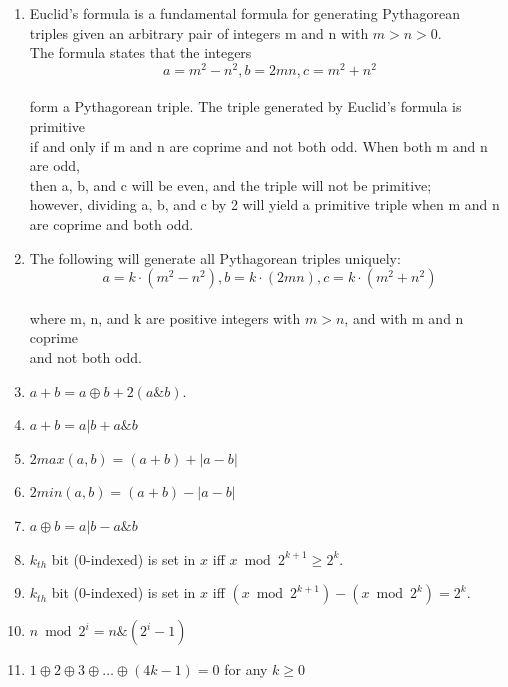 \begin{enumerate}
  \item Euclid's formula is a fundamental formula for generating Pythagorean\\
  triples given an arbitrary pair of integers m and n with $m > n > 0$. \\
  The formula states that the integers\\
  $$a = m^2 - n^2, b = 2mn, c = m^2 + n^2$$\\
  form a Pythagorean triple. The triple generated by Euclid's formula is primitive \\
  if and only if m and n are coprime and not both odd. When both m and n are odd, \\
  then a, b, and c will be even, and the triple will not be primitive; \\
  however, dividing a, b, and c by 2 will yield a primitive triple when m and n \\
  are coprime and both odd.

  \item The following will generate all Pythagorean triples uniquely:  \\
  $$a = k \cdot (m^2 - n^2) , b = k \cdot (2mn) , c = k \cdot (m^2 + n^2)$$\\
  where m, n, and k are positive integers with $m > n$, and with m and n coprime \\
  and not both odd.  

  \item $a + b = a \oplus b + 2(a \& b)$.
  \item $a + b = a | b + a \& b$
  \item $2 max(a, b) = (a+b) + |a-b|$
  \item $2 min(a, b) = (a+b) - |a-b|$
  \item $a \oplus b = a | b - a \& b$
  \item $k_{th}$ bit (0-indexed) is set in $x$ iff $x \bmod 2^{k+1} \ge 2^k$.
  \item $k_{th}$ bit (0-indexed) is set in $x$ iff $(x \bmod 2^{k+1}) - (x \bmod 2^k) = 2^k$.
  \item $n \bmod 2^i = n \& (2^i - 1)$
  \item $1 \oplus 2 \oplus 3 \oplus \dots \oplus (4k - 1) = 0$ for any $k \ge 0$
\end{enumerate}
